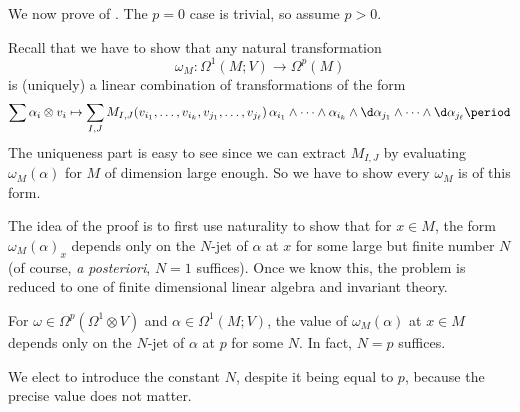 We now prove of . The $p = 0$ case is trivial, so assume $p > 0$.

Recall that we have to show that any natural transformation
\begin{equation*}
  \omega_M\colon \Omega^1(M; V) \to \Omega^p(M)
\end{equation*}
is (uniquely) a linear combination of transformations of the form
\begin{equation*}
  \sum \alpha_i \otimes v_i \mapsto \sum_{I, J} M_{I, J}(v_{i_1}, \ldots, v_{i_k}, v_{j_1}, \ldots, v_{j_\ell})\, \alpha_{i_1} \wedge \cdots \wedge \alpha_{i_k} \wedge \d \alpha_{j_1} \wedge \cdots \wedge \d \alpha_{j_\ell} \period
\end{equation*}
The uniqueness part is easy to see since we can extract $M_{I, J}$ by evaluating $\omega_M(\alpha)$ for $M$ of dimension large enough. So we have to show every $\omega_M$ is of this form.

The idea of the proof is to first use naturality to show that for $x \in M$, the form $\omega_M(\alpha)_x$ depends only on the $N$-jet of $\alpha$ at $x$ for some large but finite number $N$ (of course, \emph{a posteriori}, $N = 1$ suffices). Once we know this, the problem is reduced to one of finite dimensional linear algebra and invariant theory.

\begin{lemma}
  For $\omega \in \Omega^p(\Omega^1 \otimes V)$ and $\alpha \in \Omega^1(M; V)$, the value of $\omega_M(\alpha)$ at $x \in M$ depends only on the $N$-jet of $\alpha$ at $p$ for some $N$. In fact, $N = p$ suffices.
\end{lemma}
We elect to introduce the constant $N$, despite it being equal to $p$, because the precise value does not matter.

